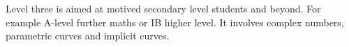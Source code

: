 Level three is aimed at motived secondary level students and beyond. For
example A-level further maths or IB higher level. It involves complex numbers,
parametric curves and implicit curves.
